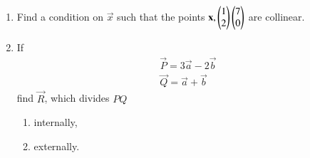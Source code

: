 \begin{enumerate}[label=\arabic*.,ref=\thesubsection.\theenumi]
\begin{enumerate}
\item {},  ,   
\item {},  ,   
\end{enumerate}
\item Find a condition on $\vec{x}$  such that the points $\mathbf{x}, \begin{pmatrix}1\\2\end{pmatrix}\begin{pmatrix}7\\0\end{pmatrix}$ are collinear.
\item If 
\begin{align}
\vec{P} = 3\vec{a}-2\vec{b}
\\
\vec{Q} = \vec{a}+\vec{b}
\end{align}
%
find $\vec{R}$, which divides $PQ$ 
\begin{enumerate}
\item internally,
\item externally.
\end{enumerate}
\end{enumerate}
%
